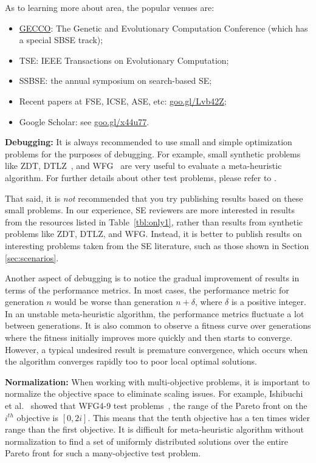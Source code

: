 \documentclass[sigconf]{acmart}
\begin{document}
As to learning more about area, the popular venues are: 
\begin{itemize}[leftmargin=*]
\item \href{http://gecco-2018.sigevo.org/index.html/HomePage}{GECCO}: The Genetic and Evolutionary Computation Conference (which has a special SBSE track);
\item TSE: IEEE Transactions on Evolutionary Computation;
\item SSBSE: the annual symposium on search-based SE;
\item Recent papers   at FSE, ICSE, ASE, etc: \url{goo.gl/Lvb42Z};
\item Google Scholar: see  \url{goo.gl/x44u77}.
\end{itemize}
  \noindent\textbf{Debugging: } It is always recommended to use small and simple {optimization problems} for the purposes of debugging. For example, small synthetic {problems} like ZDT, DTLZ~\cite{deb2005scalable}, and WFG~\cite{huband2006review} are very useful to evaluate a meta-heuristic algorithm. For further details about other test problems, please refer to \cite{huband2006review}.  
  
  That said, it is {\em not} recommended that you try publishing results based on these small {problems}. In our experience, SE reviewers are more interested in results from the resources listed in Table~\ref{tbl:only1}, rather than results from synthetic {problems} like ZDT, DTLZ, and WFG. Instead, it is better to publish results on interesting problems taken from the SE literature, such as those shown in Section \ref{sec:scenarios}.
  
  Another aspect of debugging is to notice the gradual improvement of results in terms of the performance metrics. In most cases, the performance metric for generation $n$ would be worse than generation $n+\delta$, where $\delta$ is a positive integer. In an unstable meta-heuristic algorithm, the performance metrics fluctuate a lot between generations. 
  {It is also common to observe a fitness curve over generations where the fitness initially improves more quickly and then starts to converge. However, a typical undesired result is premature convergence, which occurs when the algorithm converges rapidly too to poor local optimal solutions.}

  \noindent\textbf{Normalization: } When working with multi-objective problems, it is important to normalize the objective space to eliminate scaling issues. For example, Ishibuchi et al.~\cite{ishibuchi2017effect} showed that WFG4-9 test problems~\cite{huband2006review}, the range
of the Pareto front on the $i^{th}$ objective is $[0, 2i]$. This means
that the tenth objective has a ten times wider range than
the first objective. It is difficult for meta-heuristic algorithm without normalization
to find a set of uniformly distributed solutions over the entire Pareto front for such a many-objective test
problem. 
\end{document}
